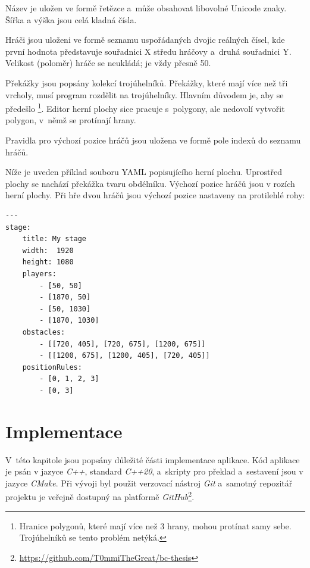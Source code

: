 Název je uložen ve formě řetězce a~může obsahovat libovolné Unicode znaky. Šířka a výška jsou celá kladná čísla.

Hráči jsou uloženi ve formě seznamu uspořádaných dvojic reálných čísel, kde první hodnota představuje souřadnici X středu hráčovy  a~druhá souřadnici Y. Velikost (poloměr) hráče se neukládá; je vždy přesně 50.

Překážky jsou popsány kolekcí trojúhelníků. Překážky, které mají více než tři vrcholy, musí program rozdělit na trojúhelníky. Hlavním důvodem je, aby se předešlo \footnote{Hranice polygonů, které mají více než 3 hrany, mohou protínat samy sebe. Trojúhelníků se tento problém netýká.}. Editor herní plochy sice pracuje s~polygony, ale nedovolí vytvořit polygon, v~němž se protínají hrany.

Pravidla pro výchozí pozice hráčů jsou uložena ve formě pole indexů do seznamu hráčů.

Níže je uveden příklad souboru YAML popisujícího herní plochu. Uprostřed plochy se nachází překážka tvaru obdélníku. Výchozí pozice hráčů jsou v rozích herní plochy. Při hře dvou hráčů jsou výchozí pozice nastaveny na protilehlé rohy:
\begin{center}
\begin{minipage}{\textwidth}
    \begin{verbatim}
---
stage:
    title: My stage
    width:  1920
    height: 1080
    players: 
        - [50, 50]
        - [1870, 50]
        - [50, 1030]
        - [1870, 1030]
    obstacles:
        - [[720, 405], [720, 675], [1200, 675]]
        - [[1200, 675], [1200, 405], [720, 405]]
    positionRules:
        - [0, 1, 2, 3]
        - [0, 3]
    \end{verbatim}
\end{minipage}
\end{center}


\chapter{Implementace}
\label{ch:implementace}

V~této kapitole jsou popsány důležité části implementace aplikace. Kód aplikace je psán v jazyce \emph{C++}, standard \emph{C++20}, a~skripty pro překlad a~sestavení jsou v jazyce \emph{CMake}. Při vývoji byl použit verzovací nástroj \emph{Git} a~samotný repozitář projektu je veřejně dostupný na platformě \emph{GitHub}\footnote{\url{https://github.com/T0mmiTheGreat/bc-thesis}}.


